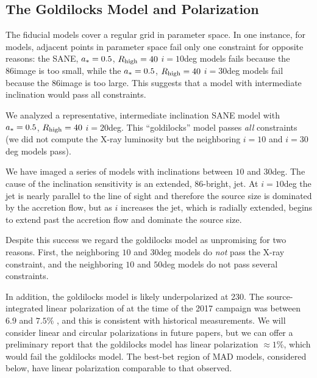 


\subsection{The Goldilocks Model and Polarization}

The fiducial models cover a regular grid in parameter space.  In one instance, for \kharma models, adjacent points in parameter space fail only one constraint for opposite reasons: the SANE, $a_* = 0.5$, $R_\mathrm{high} = 40$ $i = 10$deg models fails because the 86\GHz image is too small, while the $a_* = 0.5$, $R_\mathrm{high} = 40$ $i = 30$deg models fail because the 86\GHz image is too large.  This suggests that a model with intermediate inclination would pass all constraints.

We analyzed a representative, intermediate inclination \kharma SANE model with $a_* = 0.5$, $R_\mathrm{high} = 40$ $i = 20$deg.  This ``goldilocks'' model passes {\em all} constraints (we did not compute  the X-ray luminosity but the neighboring $i=10$ and $i=30$deg models pass).  

We have imaged a series of \kharma models with inclinations between $10$ and $30$deg.  The cause of the inclination sensitivity is an extended, 86\GHz-bright, jet.  At $i = 10$deg the jet is nearly parallel to the line of sight and therefore the source size is dominated by the accretion flow, but as $i$ increases the jet, which is radially extended, begins to extend past the accretion flow and dominate the source size.  

Despite this success we regard the goldilocks model as unpromising for two reasons.  First, the neighboring $10$ and $30$deg \bhac models do {\em not} pass the X-ray constraint, and the neighboring $10$ and $50$deg \hamr models do not pass several constraints.   

In addition, the goldilocks model is likely underpolarized at 230\GHz.  The source-integrated linear polarization of \sgra at the time of the 2017 campaign was between $6.9$ and $7.5$\% \citep{2021ApJ...910L..14G}, and this is consistent with historical measurements.  We will consider linear and circular polarizations in future papers, but we can offer a preliminary report that the goldilocks model has linear polarization $\approx 1$\%, which would fail the goldilocks model.  The best-bet region of MAD models, considered below, have linear polarization comparable to that observed.

